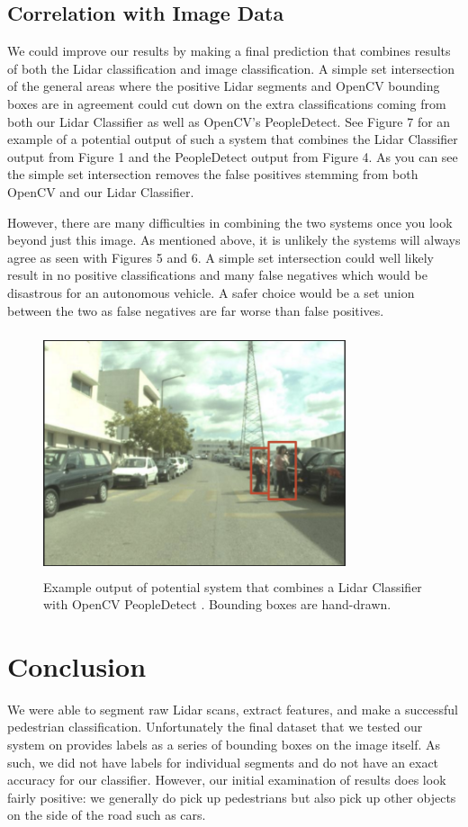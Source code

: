 \documentclass[10pt,twocolumn,letterpaper]{article}
\begin{document}
  \subsection{Correlation with Image Data}
  We could improve our results by making a final prediction that combines
  results of both the Lidar classification and image classification. A simple
  set intersection of the general areas where the positive Lidar segments and OpenCV
  bounding boxes are in agreement could cut down on the extra classifications coming from
  both our Lidar Classifier as well as OpenCV's PeopleDetect. See Figure 7 for an example of a potential
  output of such a system that combines the Lidar Classifier output from Figure 1
  and the PeopleDetect output from Figure 4. As you can see
  the simple set intersection removes the false positives stemming from both OpenCV and
  our Lidar Classifier.

  However, there are many difficulties in combining the two systems once you look
  beyond just this image. As mentioned above, it is unlikely the systems will always
  agree as seen with Figures 5 and 6. A simple set intersection could well likely result
  in no positive classifications and many false negatives which would be disastrous
  for an autonomous vehicle. A safer choice would be a set union between the two as
  false negatives are far worse than false positives.

  \begin{figure}
    \includegraphics[height=2.8in, width=3.5in]{images/futureWork.png}
    \caption{ Example output of potential system that combines a Lidar Classifier 
    with OpenCV PeopleDetect \cite{opencv}. Bounding boxes are hand-drawn. }
  \end{figure}

\section{Conclusion}
  We were able to segment raw Lidar scans, extract
  features, and make a successful pedestrian classification. 
  Unfortunately the final dataset that
  we tested our system on provides labels as a series of bounding boxes on the
  image itself. As such, we did not have labels for individual segments and do
  not have an exact accuracy for our classifier. However, our initial examination
  of results does look fairly positive: we generally do pick up pedestrians
  but also pick up other objects on the side of the road such as cars.
\end{document}
